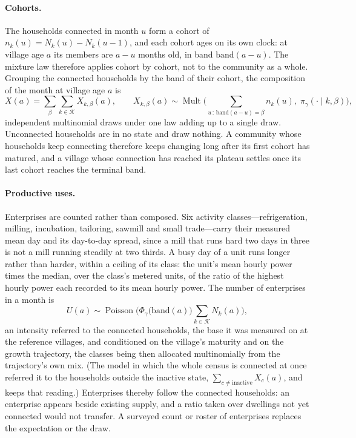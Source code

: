 \documentclass[11pt,a4paper]{article}
\theoremstyle{plain}
\theoremstyle{definition}
\newcommand{\band}{\mathrm{band}}
\begin{document}
\paragraph{Cohorts.} The households connected in month $u$ form a cohort of
$n_k(u)=N_k(u)-N_k(u-1)$, and each cohort ages on its own clock: at village age $a$ its
members are $a-u$ months old, in band $\band(a-u)$. The mixture law therefore applies cohort
by cohort, not to the community as a whole. Grouping the connected households by the band of
their cohort, the composition of the month at village age $a$ is
\begin{equation}
  X(a) = \sum_{\beta}\sum_{k\in\mathcal{K}} X_{k,\beta}(a),
  \qquad
  X_{k,\beta}(a) \sim \operatorname{Mult}\Big(\sum_{u\,:\,\band(a-u)=\beta} n_k(u),\;
  \pi_\gamma(\cdot\mid k,\beta)\Big),
  \label{eq:composition}
\end{equation}
independent multinomial draws under one law adding up to a single draw. Unconnected
households are in no state and draw nothing. A community whose households keep connecting
therefore keeps changing long after its first cohort has matured, and a village whose
connection has reached its plateau settles once its last cohort reaches the terminal band.

\paragraph{Productive uses.} Enterprises are counted rather than composed. Six activity
classes---refrigeration, milling, incubation, tailoring, sawmill and small trade---carry
their measured mean day and its day-to-day spread, since a mill that runs hard two days in
three is not a mill running steadily at two thirds. A busy day of a unit runs longer rather
than harder, within a ceiling of its class: the unit's mean hourly power times the median,
over the class's metered units, of the ratio of the highest hourly power each recorded to its
mean hourly power. The number of enterprises in a month is
\begin{equation}
  U(a) \sim \operatorname{Poisson}\Big(\Phi_\gamma\big(\band(a)\big)
  \sum_{k\in\mathcal{K}} N_k(a)\Big),
\end{equation}
an intensity referred to the connected households, the base it was measured on at the
reference villages, and conditioned on the village's maturity and on the growth trajectory,
the classes being then allocated multinomially from the trajectory's own mix. (The model in
which the whole census is connected at once referred it to the households outside the
inactive state, $\sum_{c\neq\mathrm{inactive}} X_c(a)$, and keeps that reading.) Enterprises thereby follow the
connected households: an enterprise appears beside existing supply, and a ratio taken over
dwellings not yet connected would not transfer. A surveyed count or roster of enterprises
replaces the expectation or the draw.
\end{document}
